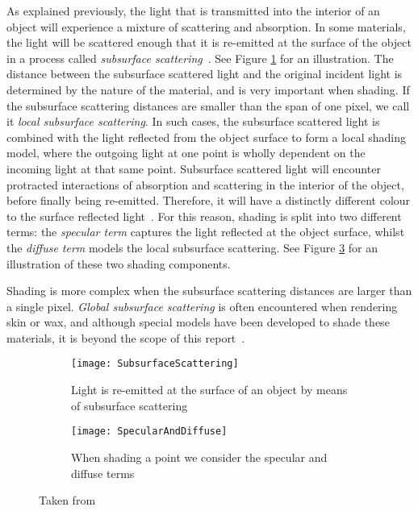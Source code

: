 As explained previously, the light that is transmitted into the interior of an object will experience a mixture of scattering and absorption. In some materials, the light will be scattered enough that it is re-emitted at the surface of the object in a process called \textit{subsurface scattering}~\cite{Spectroscopy}. See Figure \ref{fig:SubsurfaceScattering} for an illustration. The distance between the subsurface scattered light and the original incident light is determined by the nature of the material, and is very important when shading. If the subsurface scattering distances are smaller than the span of one pixel, we call it \textit{local subsurface scattering}. In such cases, the subsurface scattered light is combined with the light reflected from the object surface to form a local shading model, where the outgoing light at one point is wholly dependent on the incoming light at that same point. Subsurface scattered light will encounter protracted interactions of absorption and scattering in the interior of the object, before finally being re-emitted. Therefore, it will have a distinctly different colour to the surface reflected light~\cite{ReflectionFromLayeredSurfaces}. For this reason, shading is split into two different terms: the \textit{specular term} captures the light reflected at the object surface, whilst the \textit{diffuse term} models the local subsurface scattering. See Figure \ref{fig:SpecularAndDiffuse} for an illustration of these two shading components.

Shading is more complex when the subsurface scattering distances are larger than a single pixel. \textit{Global subsurface scattering} is often encountered when rendering skin or wax, and although special models have been developed to shade these materials, it is beyond the scope of this report~\cite{SeparableSubsurfaceScattering}.

\begin{figure}[h]
	\begin{subfigure}{0.48\textwidth}
		\texttt{[image: SubsurfaceScattering]}
		\caption{Light is re-emitted at the surface of an object by means of subsurface scattering}
		\label{fig:SubsurfaceScattering}
	\end{subfigure}
	\hspace*{\fill}
	\begin{subfigure}{0.48\textwidth}
		\texttt{[image: SpecularAndDiffuse]}
		\caption{When shading a point we consider the specular and diffuse terms}
		\label{fig:SpecularAndDiffuse}
	\end{subfigure}
	\caption{Taken from~\cite{RTR4}}
\end{figure}

